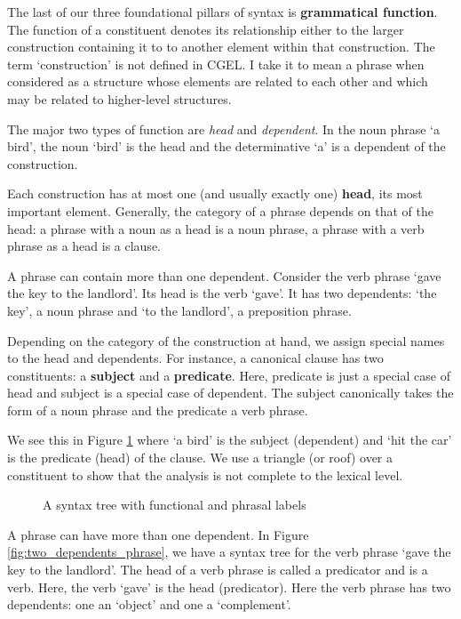 \documentclass{scrarticle}
\begin{document}
The last of our three foundational pillars of syntax is \textbf{grammatical function}. The function
of a constituent denotes its relationship either to the larger construction containing it to to
another element within that construction. The term `construction' is not defined in CGEL. I take it
to mean a phrase when considered as a structure whose elements are related to each other and which
may be related to higher-level structures.

The major two types of function are \emph{head} and \emph{dependent}. In the noun phrase `a bird',
the noun `bird' is the head and the determinative `a' is a dependent of the construction.

Each construction has at most one (and usually exactly one) \textbf{head}, its most important
element. Generally, the category of a phrase depends on that of the head: a phrase with a noun as a
head is a noun phrase, a phrase with a verb phrase as a head is a clause.

A phrase can contain more than one dependent. Consider the verb phrase `gave the key to the
landlord'. Its head is the verb `gave'. It has two dependents: `the key', a noun phrase and `to the
landlord', a preposition phrase.

Depending on the category of the construction at hand, we assign special names to the head and
dependents. For instance, a canonical clause has two constituents: a \textbf{subject} and a
\textbf{predicate}. Here, predicate is just a special case of head and subject is a special case of
dependent. The subject canonically takes the form of a noun phrase and the predicate a verb phrase.

We see this in Figure \ref{fig:abirdhitthecar_functional_phrasal} where `a bird' is the subject
(dependent) and `hit the car' is the predicate (head) of the clause. We use a triangle (or roof)
over a constituent to show that the analysis is not complete to the lexical level.

\begin{figure}[ht]
\caption{A syntax tree with functional and phrasal labels}
\label{fig:abirdhitthecar_functional_phrasal}
\end{figure}

A phrase can have more than one dependent. In Figure \ref{fig:two_dependents_phrase}, we have a
syntax tree for the verb phrase `gave the key to the landlord'. The head of a verb phrase is called
a predicator and is a verb. Here, the verb `gave' is the head (predicator). Here the verb phrase has
two dependents: one an `object' and one a `complement'.
\end{document}
